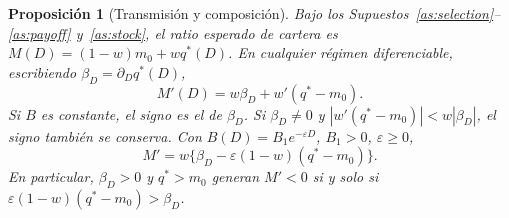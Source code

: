 \documentclass[11pt]{article}
\newtheorem{proposition}{Proposición}
\theoremstyle{definition}\newtheorem{assumption}{Supuesto}
\begin{document}
\begin{proposition}[Transmisión y composición]\label{p:stock}
Bajo los Supuestos~\ref{as:selection}--\ref{as:payoff} y~\ref{as:stock}, el
ratio esperado de cartera es $M(D)=(1-w)m_0+wq^*(D)$. En cualquier régimen
diferenciable, escribiendo $\beta_D=\partial_Dq^*(D)$,
\begin{equation}\label{eq:stock}
M'(D)=w\beta_D+w'(q^*-m_0).
\end{equation}
Si $B$ es constante, el signo es el de $\beta_D$. Si $\beta_D\ne0$ y
$|w'(q^*-m_0)|<w|\beta_D|$, el signo también se conserva.
Con $B(D)=B_1e^{-\varepsilon D}$, $B_1>0$, $\varepsilon\ge0$,
\begin{equation}\label{eq:composition}
M'=w\{\beta_D-\varepsilon(1-w)(q^*-m_0)\}.
\end{equation}
En particular, $\beta_D>0$ y $q^*>m_0$ generan $M'<0$ si y solo si
$\varepsilon(1-w)(q^*-m_0)>\beta_D$.
\end{proposition}
\end{document}
